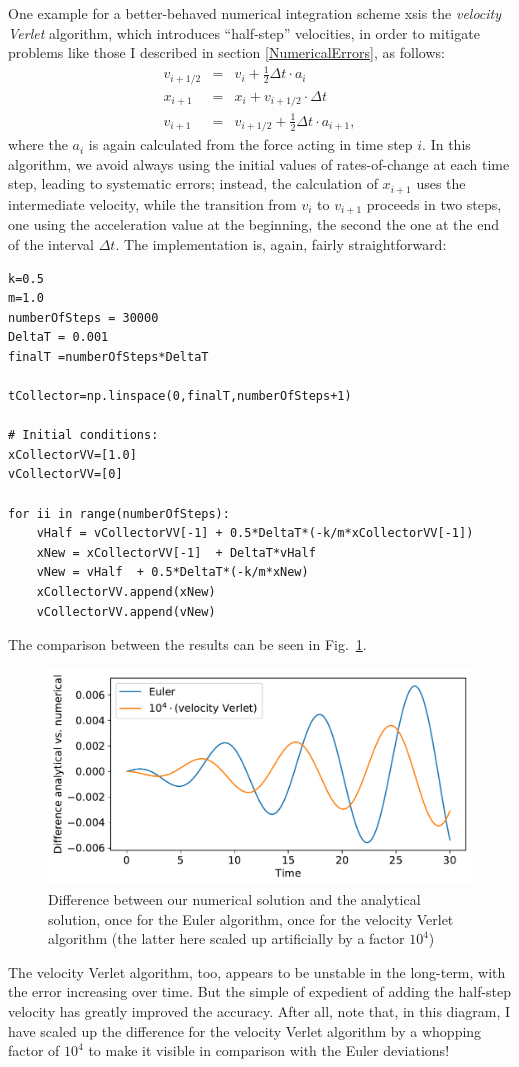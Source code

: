 \documentclass[twocolumn,apj]{openjournal}
\newcommand{\bea}{\begin{eqnarray}}
\newcommand{\eea}{\end{eqnarray}}
\begin{document}
One example for a better-behaved numerical integration scheme xsis the {\em velocity Verlet} algorithm, which introduces ``half-step'' velocities, in order to mitigate problems like those I described in section \ref{NumericalErrors}, as follows:
\bea
v_{i+1/2} &=& v_i + \frac{1}{2}\Delta t\cdot a_i\\[0.5em]
x_{i+1} &=& x_i + v_{i+1/2}\cdot\Delta t\\[0.5em]
v_{i+1} &=& v_{i+1/2} + \frac{1}{2}\Delta t\cdot a_{i+1},
\eea
where the $a_i$ is again calculated from the force acting in time step $i$. In this algorithm, we avoid always using the initial values of rates-of-change at each time step, leading to systematic errors; instead, the calculation of $x_{i+1}$ uses the intermediate velocity, while the transition from $v_i$ to $v_{i+1}$ proceeds in two steps, one using the acceleration value at the beginning, the second the one at the end of the interval $\Delta t$. The implementation is, again, fairly straightforward:
\begin{lstlisting}
k=0.5
m=1.0
numberOfSteps = 30000
DeltaT = 0.001
finalT =numberOfSteps*DeltaT

tCollector=np.linspace(0,finalT,numberOfSteps+1)

# Initial conditions:
xCollectorVV=[1.0]
vCollectorVV=[0]

for ii in range(numberOfSteps):
    vHalf = vCollectorVV[-1] + 0.5*DeltaT*(-k/m*xCollectorVV[-1])
    xNew = xCollectorVV[-1]  + DeltaT*vHalf
    vNew = vHalf  + 0.5*DeltaT*(-k/m*xNew)
    xCollectorVV.append(xNew)
    vCollectorVV.append(vNew)
\end{lstlisting}
The comparison between the results can be seen in Fig.~\ref{VVEuler}.
\begin{figure}[htbp]
\begin{center}
\includegraphics[width=\linewidth]{oscillator-euler-vv-diff.pdf}
\caption{Difference between our numerical solution and the analytical solution, once for the Euler algorithm, once for the velocity Verlet algorithm (the latter here scaled up artificially by a factor $10^4$)}
\label{VVEuler}
\end{center}
\end{figure}
The velocity Verlet algorithm, too, appears to be unstable in the long-term, with the error increasing over time. But the simple of expedient of adding the half-step velocity has greatly improved the accuracy. After all, note that, in this diagram, I have scaled up the difference for the velocity Verlet algorithm by a whopping factor of $10^4$ to make it visible in comparison with the Euler deviations! 
\end{document}
